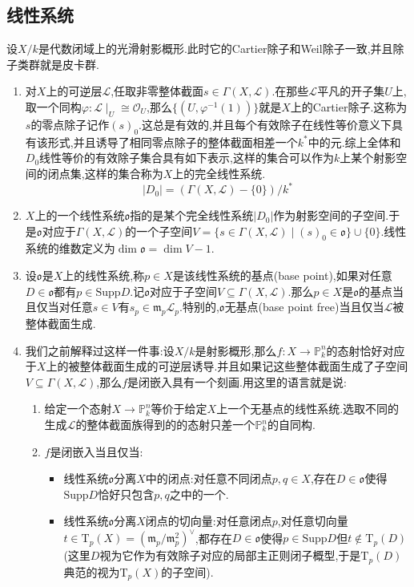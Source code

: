\subsection{线性系统}

设$X/k$是代数闭域上的光滑射影概形.此时它的Cartier除子和Weil除子一致,并且除子类群就是皮卡群.
\begin{enumerate}
	\item 对$X$上的可逆层$\mathscr{L}$,任取非零整体截面$s\in\Gamma(X,\mathscr{L})$.在那些$\mathscr{L}$平凡的开子集$U$上,取一个同构$\varphi:\mathscr{L}\mid_U\cong\mathscr{O}_U$,那么$\{(U,\varphi^{-1}(1))\}$就是$X$上的Cartier除子.这称为$s$的零点除子记作$(s)_0$.这总是有效的,并且每个有效除子在线性等价意义下具有该形式,并且诱导了相同零点除子的整体截面相差一个$k^*$中的元.综上全体和$D_0$线性等价的有效除子集合具有如下表示,这样的集合可以作为$k$上某个射影空间的闭点集,这样的集合称为$X$上的完全线性系统.
	$$|D_0|=(\Gamma(X,\mathscr{L})-\{0\})/k^*$$
	\item $X$上的一个线性系统$\mathfrak{o}$指的是某个完全线性系统$|D_0|$作为射影空间的子空间.于是$\mathfrak{o}$对应于$\Gamma(X,\mathscr{L})$的一个子空间$V=\{s\in\Gamma(X,\mathscr{L})\mid(s)_0\in\mathfrak{o}\}\cup\{0\}$.线性系统的维数定义为$\dim\mathfrak{o}=\dim V-1$.
	\item 设$\mathfrak{o}$是$X$上的线性系统,称$p\in X$是该线性系统的基点(base point),如果对任意$D\in\mathfrak{o}$都有$p\in\mathrm{Supp}D$.记$\mathfrak{o}$对应于子空间$V\subseteq\Gamma(X,\mathscr{L})$.那么$p\in X$是$\mathfrak{o}$的基点当且仅当对任意$s\in V$有$s_p\in\mathfrak{m}_p\mathscr{L}_p$.特别的,$\mathfrak{o}$无基点(base point free)当且仅当$\mathscr{L}$被整体截面生成.
	\item 我们之前解释过这样一件事:设$X/k$是射影概形,那么$f:X\to\mathbb{P}_k^n$的态射恰好对应于$X$上的被整体截面生成的可逆层诱导.并且如果记这些整体截面生成了子空间$V\subseteq\Gamma(X,\mathscr{L})$,那么$f$是闭嵌入具有一个刻画.用这里的语言就是说:
	\begin{enumerate}[(1)]
		\item 给定一个态射$X\to\mathbb{P}_k^n$等价于给定$X$上一个无基点的线性系统.选取不同的生成$\mathscr{L}$的整体截面族得到的的态射只差一个$\mathbb{P}_k^n$的自同构.
		\item $f$是闭嵌入当且仅当:
		\begin{itemize}
			\item 线性系统$\mathfrak{o}$分离$X$中的闭点:对任意不同闭点$p,q\in X$,存在$D\in\mathfrak{o}$使得$\mathrm{Supp}D$恰好只包含$p,q$之中的一个.
			\item 线性系统$\mathfrak{o}$分离$X$闭点的切向量:对任意闭点$p$,对任意切向量$t\in\mathrm{T}_p(X)=(\mathfrak{m}_p/\mathfrak{m}_p^2)^{\vee}$,都存在$D\in\mathfrak{o}$使得$p\in\mathrm{Supp}D$但$t\not\in\mathrm{T}_p(D)$(这里$D$视为它作为有效除子对应的局部主正则闭子概型,于是$\mathrm{T}_p(D)$典范的视为$\mathrm{T}_p(X)$的子空间).

\end{itemize}
\end{enumerate}
\end{enumerate}
